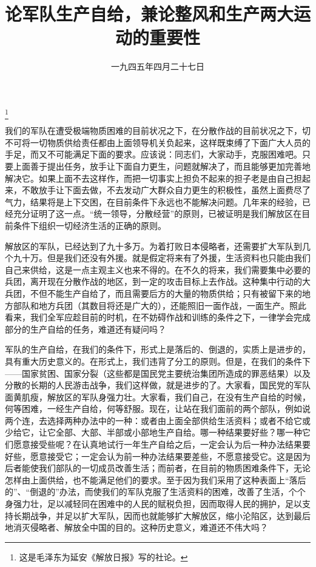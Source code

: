
\title{论军队生产自给，兼论整风和生产两大运动的重要性}
\date{一九四五年四月二十七日}
\thanks{这是毛泽东为延安《解放日报》写的社论。}
\maketitle


我们的军队在遭受极端物质困难的目前状况之下，在分散作战的目前状况之下，切不可将一切物质供给责任都由上面领导机关负起来，这样既束缚了下面广大人员的手足，而又不可能满足下面的要求。应该说：同志们，大家动手，克服困难吧。只要上面善于提出任务，放手让下面自力更生，问题就解决了，而且能够更加完善地解决它。如果上面不去这样作，而把一切事实上担负不起来的担子老是由自己担起来，不敢放手让下面去做，不去发动广大群众自力更生的积极性，虽然上面费尽了气力，结果将是上下交困，在目前条件下永远也不能解决问题。几年来的经验，已经充分证明了这一点。“统一领导，分散经营”的原则，已被证明是我们解放区在目前条件下组织一切经济生活的正确的原则。

解放区的军队，已经达到了九十多万。为着打败日本侵略者，还需要扩大军队到几个九十万。但是我们还没有外援。就是假定将来有了外援，生活资料也只能由我们自己来供给，这是一点主观主义也来不得的。在不久的将来，我们需要集中必要的兵团，离开现在分散作战的地区，到一定的攻击目标上去作战。这种集中行动的大兵团，不但不能生产自给了，而且需要后方的大量的物质供给；只有被留下来的地方部队和地方兵团（其数目将还是广大的），还能照旧一面作战，一面生产。照此看来，我们全军应趁目前的时机，在不妨碍作战和训练的条件之下，一律学会完成部分的生产自给的任务，难道还有疑问吗？

军队的生产自给，在我们的条件下，形式上是落后的、倒退的，实质上是进步的，具有重大历史意义的。在形式上，我们违背了分工的原则。但是，在我们的条件下——国家贫困、国家分裂（这些都是国民党主要统治集团所造成的罪恶结果）以及分散的长期的人民游击战争，我们这样做，就是进步的了。大家看，国民党的军队面黄肌瘦，解放区的军队身强力壮。大家看，我们自己，在没有生产自给的时候，何等困难，一经生产自给，何等舒服。现在，让站在我们面前的两个部队，例如说两个连，去选择两种办法中的一种：或者由上面全部供给生活资料；或者不给它或少给它，让它全部、大部、半部或小部地生产自给。哪一种结果要好些？哪一种它们愿意接受些呢？在认真地试行一年生产自给之后，一定会认为后一种办法结果要好些，愿意接受它；一定会认为前一种办法结果要差些，不愿意接受它。这是因为后者能使我们部队的一切成员改善生活；而前者，在目前的物质困难条件下，无论怎样由上面供给，也不能满足他们的要求。至于因为我们采用了这种表面上“落后的”、“倒退的”办法，而使我们的军队克服了生活资料的困难，改善了生活，个个身强力壮，足以减轻同在困难中的人民的赋税负担，因而取得人民的拥护，足以支持长期战争，并足以扩大军队，因而也就能够扩大解放区，缩小沦陷区，达到最后地消灭侵略者、解放全中国的目的。这种历史意义，难道还不伟大吗？

